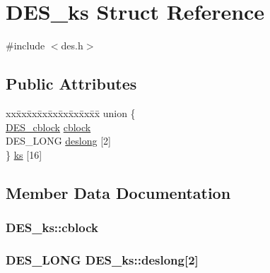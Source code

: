 \hypertarget{struct_d_e_s__ks}{}\section{D\+E\+S\+\_\+ks Struct Reference}
\label{struct_d_e_s__ks}


{\ttfamily \#include $<$des.\+h$>$}

\subsection*{Public Attributes}
\begin{DoxyCompactItemize}
\item 
\begin{tabbing}
xx\=xx\=xx\=xx\=xx\=xx\=xx\=xx\=xx\=\kill
union \{\\
\>\hyperlink{des_8h_adcbbb795f912b83b7aa8c2660eb1bee4}{DES\_cblock} \hyperlink{struct_d_e_s__ks_ab5f0be124e2ad3f488c42b74c1201533}{cblock}\\
\>DES\_LONG \hyperlink{struct_d_e_s__ks_a5787059f1a0a88dc922e501f03a8ed50}{deslong} \mbox{[}2\mbox{]}\\
\} \hyperlink{struct_d_e_s__ks_a73d257d1231d7c06d70d657c63819edd}{ks} \mbox{[}16\mbox{]}\\

\end{tabbing}\end{DoxyCompactItemize}


\subsection{Member Data Documentation}
\subsubsection[{\texorpdfstring{cblock}{cblock}}]{ D\+E\+S\+\_\+ks\+::cblock}\hypertarget{struct_d_e_s__ks_ab5f0be124e2ad3f488c42b74c1201533}{}\label{struct_d_e_s__ks_ab5f0be124e2ad3f488c42b74c1201533}
\subsubsection[{\texorpdfstring{deslong}{deslong}}]{\setlength{\rightskip}{0pt plus 5cm}D\+E\+S\+\_\+\+L\+O\+NG D\+E\+S\+\_\+ks\+::deslong\mbox{[}2\mbox{]}}\hypertarget{struct_d_e_s__ks_a5787059f1a0a88dc922e501f03a8ed50}{}\label{struct_d_e_s__ks_a5787059f1a0a88dc922e501f03a8ed50}

